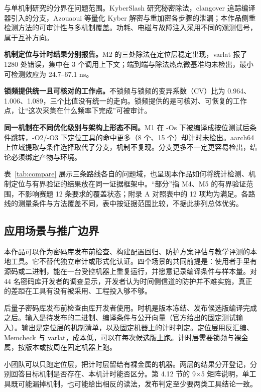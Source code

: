 与单机制研究的分界在问题范围。KyberSlash 研究秘密除法，clangover 追踪编译器引入的分支，Azouaoui 等量化 Kyber 解密与重加密各步骤的泄漏\cite{kyberslash,clangover,azouaoui2021}；本作品侧重检测方法的可审计性与多机制覆盖。功耗、电磁与故障注入采用不同的观测信号，属于互补方向。

\textbf{机制定位与计时结果分别报告。}M2 的三处除法在定位层稳定出现，varlat 报了 1280 处错误，集中在 3 个调用上下文；端到端与除法热点微基准均未检出，最小可检测效应为 24.7--67.1 ns。%

\textbf{锁频提供统一且可核对的工作点。}不锁频与锁频的变异系数（CV）比为 0.964、1.006、1.089，三个比值没有统一的走向。锁频提供的是可核对、可恢复的工作点，让“这次采集在什么频率下完成”可被审计。%

\textbf{同一机制在不同优化级别与架构上形态不同。}M1 在 -Os 下被编译成按位测试后条件跳转，-O2/-O3 下定位工具的命中更多（8 个、15 个）却计时未检出。aarch64 上位域提取与条件选择取代了分支，机制不复现。分支更多不一定更容易检出，结论必须绑定产物与环境。%

表~\ref{tab:compare} 展示三条路线各自的问题域，也呈现本作品如何将统计检测、机制定位与有界验证的结果放在同一证据框架中。“部分”指 M4、M5 的有界验证范围，不影响赛题 12 条要求的覆盖状态；附录 A 对照表中的 12 项均为满足。各路线的测量条件与方法覆盖不同，表中按证据范围比较，不据此排列总体优劣。

\subsection{应用场景与推广边界}

本作品可以作为密码库发布前检查、构建配置回归、防护方案评估与教学评测的本地工具。它不替代独立审计或形式化认证。四个场景的共同前提是：使用者手里有源码或二进制，能在一台受控机器上重复运行，并愿意记录编译条件与样本量。对 44 名密码库开发者的调查显示，开发者认为时间侧信道的防护并不难实施，真正的差距在工具有没有被采用、工程投入够不够\cite{jancar2022}。

后量子密码库发布前检查由库开发者使用。时机是版本冻结、发布候选版编译完成之后。输入是待发布的二进制、编译条件与公开向量（官方给出的固定测试输入）。输出是定位层的机制清单，以及固定机器上的计时判定。定位层用反汇编、Memcheck 与 varlat，成本低，可以在每次候选版上跑。计时层需要锁频与裸金属，按版本或按周在固定机器上跑。

小团队可以只跑定位层，把计时层留给有裸金属的机器。两层的结果分开登记，分别回答目标机制是否存在、本机计时能否区分。第 4.12 节的 9×5 矩阵说明，单工具既可能漏掉机制，也可能给出相反的读法，发布判定至少要两类工具结论一致。

